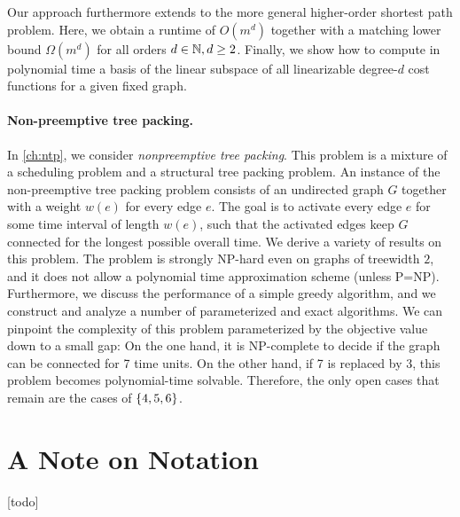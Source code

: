 Our approach furthermore extends to the more general higher-order shortest path problem. Here, we obtain a runtime of $O(m^d)$ together with a matching lower bound $\Omega(m^d)$ for all orders $d \in \mathbb{N}, d \geq 2$. 
Finally, we show how to compute in polynomial time a basis of the linear subspace of all linearizable degree-$d$ cost functions for a given fixed graph.

\paragraph*{Non-preemptive tree packing.}
In \cref{ch:ntp}, we consider \emph{nonpreemptive tree packing}. This problem is a mixture of a scheduling problem and a structural tree packing problem.
An instance of the non-preemptive tree packing problem consists of an undirected graph $G$ together with a weight $w(e)$ for every edge $e$. The goal is to activate every edge $e$ for some time interval of length $w(e)$, such that the activated edges keep $G$ connected for the longest possible overall time. We derive a variety of results on this problem. The problem is strongly NP-hard even on graphs of treewidth $2$, and it does not allow a polynomial time approximation scheme (unless P=NP). Furthermore, we discuss the performance of a simple greedy algorithm, and we construct and analyze a number of parameterized and exact algorithms.
We can pinpoint the complexity of this problem parameterized by the objective value down to a small gap: On the one hand, it is NP-complete to decide if the graph can be connected for 7 time units. On the other hand, if 7 is replaced by 3, this problem becomes polynomial-time solvable. Therefore, the only open cases that remain are the cases of $\{ 4,5,6 \}$.

\section{A Note on Notation}

[todo]